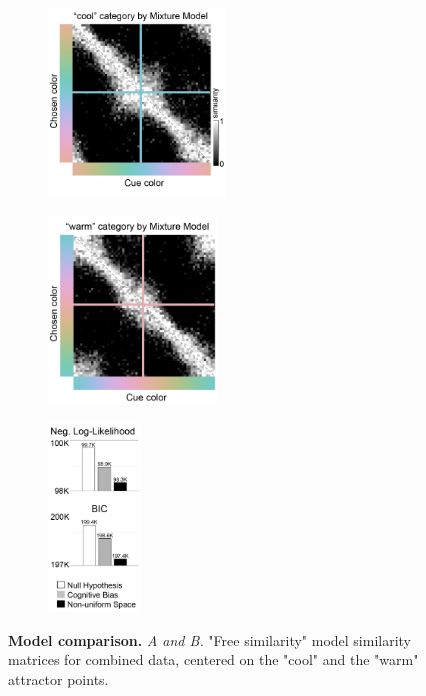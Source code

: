 \begin{figure}
    \centering
    \begin{subfigure}[t]{0.33\textwidth}
         \centering
         \caption{}
         \includegraphics[height=5cm]{../Figures/working/F4_TCCResults/a.png}         \label{fig:SimilarityMatrixCombined_Cool}
    \end{subfigure}
    \hfill
    \begin{subfigure}[t]{0.33\textwidth}
         \centering
         \caption{}
         \includegraphics[height=5cm]{../Figures/working/F4_TCCResults/b.png}   \label{fig:SimilarityMatrixCombined_Warm}
    \end{subfigure}
    \hfill
       \begin{subfigure}[t]{0.29\textwidth}
         \centering
         \caption{}
         \includegraphics[height=5cm]{../Figures/working/F4_TCCResults/c.png}   
         \label{fig:Combined-ModelFitAnalysis}
    \end{subfigure}
    \caption{\textbf{Model comparison.}
    \emph{A and B.} "Free similarity" model similarity matrices for combined data, centered on the "cool" and the "warm" attractor points. 
}
\end{figure}
